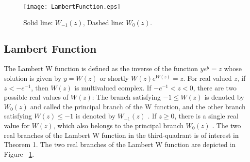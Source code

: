 \documentclass[12pt,draftcls,onecolumn]{IEEEtran}
\begin{document}
\begin{figure}[b]
\centering
\texttt{[image: LambertFunction.eps]}
\caption{ Solid line: ${W_{ - 1}}(z)$, Dashed line: $W_0(z)$.}
\label{fig:Lambert}
\end{figure}
\subsection{Lambert Function}
The Lambert W function is defined as the inverse of the function $y{e^y} = z$ whose solution is given by $y = W(z)$ or shortly $W(z){e^{W(z)}} = z$. For real valued $z$, if $z <  - {e^{ - 1}}$, then $W(z)$ is multivalued complex. If $- {e^{ - 1}} < z < 0$, there are two possible real values of $W(z)$: The branch satisfying $ - 1 \le W(z)$ is denoted by ${W_0}(z)$ and called the principal branch of the W function, and the other branch satisfying $W(z) \le  - 1$ is denoted by ${W_{ - 1}}(z)$ . If $z \ge 0$, there is a single real value for $W(z)$, which also belongs to the principal branch ${W_0}(z)$ \cite{c21}. The two real branches of the Lambert W function in the third-quadrant is of interest in Theorem 1. The two real branches of the Lambert W function are depicted in Figure ~\ref{fig:Lambert}.


 

\end{document}
